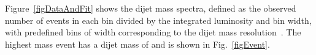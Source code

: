 Figure~\ref{figDataAndFit} shows
the dijet mass spectra, defined as the observed number of events in each bin divided by the
integrated luminosity and bin width, with predefined bins of width corresponding to the
dijet mass resolution~\cite{Khachatryan:2010jd}. 
The highest mass event has a dijet mass of \highestMass and is shown in Fig.~\ref{figEvent}. 
\begin{figure}[hbtp]
  \begin{center}

\end{center}
\end{figure}
